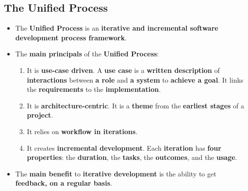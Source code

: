 \documentclass[16pt]{article}
\begin{document}
    \subsection*{The Unified Process}
    \begin{itemize}
        \item The \textbf{Unified Process} is an \textbf{iterative and incremental software development process framework}.
        \item The \textbf{main principals} of the \textbf{Unified Process}:
        \begin{enumerate}
            \item It is \textbf{use-case driven}. A \textbf{use case} is a \textbf{written description} of \textbf{interactions} between \textbf{a role} and \textbf{a system} to \textbf{achieve a goal}. It links the \textbf{requirements} to the \textbf{implementation}.
            \item It is \textbf{architecture-centric}. It is a \textbf{theme} from the \textbf{earliest stages} of a \textbf{project}.
            \item It relies on \textbf{workflow in iterations}. 
            \item It creates \textbf{incremental development}. Each \textbf{iteration} has \textbf{four properties}: the \textbf{duration}, the \textbf{tasks}, the \textbf{outcomes}, and the \textbf{usage}.
        \end{enumerate}
        \item The \textbf{main benefit} to \textbf{iterative development} is the ability to get \textbf{feedback, on a regular basis}.
    \end{itemize}
\end{document}
